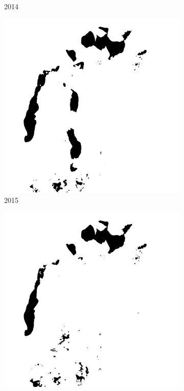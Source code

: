 \documentclass[12pt,a4paper]{article}
\begin{document}
\begin{figure}[H]
\begin{subfigure}[b]{0.19\textwidth}
        \caption{2014}
    \end{subfigure}
    \begin{subfigure}[b]{0.19\textwidth}
        \centering
        \includegraphics[width=\textwidth]{../img/2015w.jpg}
        \caption{2015}
    \end{subfigure}
    \begin{subfigure}[b]{0.19\textwidth}
        \centering
        \includegraphics[width=\textwidth]{../img/2019w.jpg}

\end{subfigure}
\end{figure}
\end{document}
